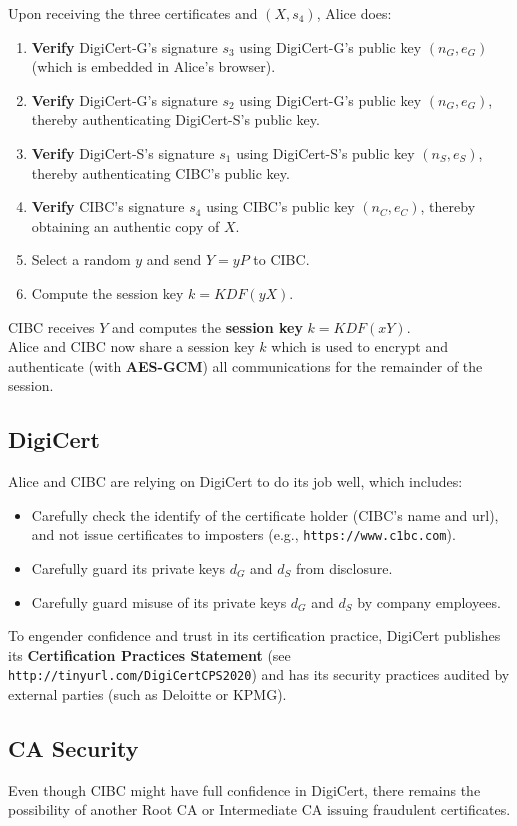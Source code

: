 \documentclass[12pt,titlepage]{article}
\begin{document}
Upon receiving the three certificates and $(X, s_4 )$, Alice does:\begin{enumerate}
	\item \textbf{Verify} DigiCert-G’s signature $s_3$ using DigiCert-G’s public key $(n_G , e_G )$ (which is embedded in Alice’s browser).
	\item \textbf{Verify} DigiCert-G’s signature $s_2$ using DigiCert-G’s public key $(n_G , e_G )$, thereby authenticating DigiCert-S’s public key.
	\item \textbf{Verify} DigiCert-S’s signature $s_1$ using DigiCert-S’s public key $(n_S , e_S )$, thereby authenticating CIBC’s public key.
	\item \textbf{Verify} CIBC’s signature $s_4$ using CIBC’s public key $(n_C , e_C )$, thereby obtaining an authentic copy of $X$.
	\item Select a random $y$ and send $Y = yP$ to CIBC.
	\item Compute the session key $k = KDF(yX)$.
\end{enumerate}
CIBC receives $Y$ and computes the \textbf{session key} $k = KDF(xY)$.\\
Alice and CIBC now share a session key $k$ which is used to encrypt and authenticate (with \textbf{AES-GCM}) all communications for the remainder of the session.
\subsection{DigiCert}
Alice and CIBC are relying on DigiCert to do its job well, which includes:\begin{itemize}
	\item Carefully check the identify of the certificate holder (CIBC’s name and url), and not issue certificates to imposters (e.g., \texttt{https://www.c1bc.com}).
	\item Carefully guard its private keys $d_G$ and $d_S$ from disclosure.
	\item Carefully guard misuse of its private keys $d_G$ and $d_S$ by company employees.
\end{itemize}
To engender confidence and trust in its certification practice, DigiCert publishes its \textbf{Certification Practices Statement} (see \texttt{http://tinyurl.com/DigiCertCPS2020}) and has its security practices audited by external parties (such as Deloitte or KPMG).

\subsection{CA Security}
Even though CIBC might have full confidence in DigiCert, there remains the possibility of another Root CA or Intermediate CA issuing fraudulent certificates.
\end{document}
